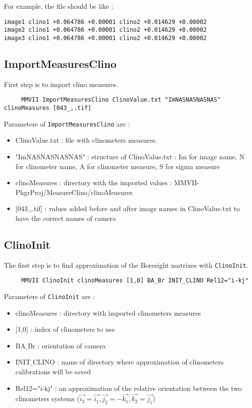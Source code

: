 For example, the file should be like :

\begin{lstlisting}
image1 clino1 +0.064786 +0.00001 clino2 +0.014629 +0.00002
image2 clino1 +0.064786 +0.00001 clino2 +0.014629 +0.00002
image3 clino1 +0.064786 +0.00001 clino2 +0.014629 +0.00002
\end{lstlisting}


\subsection{ImportMeasuresClino}

First step is to import clino measures.

\begin{lstlisting}
     MMVII ImportMeasuresClino ClinoValue.txt "ImNASNASNASNAS" clinoMeasures [043_,.tif]
\end{lstlisting}

Parameters of {\tt ImportMeasuresClino} are :
\begin{itemize}
     \item ClinoValue.txt : file with clinometers measures.
     \item "ImNASNASNASNAS" : structure of ClinoValue.txt : Im for image name, N for clinometer name, A for clinometer measure, S for sigma measure
     \item clinoMeasures : directory with the imported values : MMVII-PhgrProj/MeasureClino/clinoMeasures
     \item $[$043$\_$,.tif$]$ : values added before and after image names in ClinoValue.txt to have the correct names of camera
\end{itemize}


\subsection{ClinoInit}

The first step is to find approximation of the Boresight matrixes with {\tt ClinoInit}.

\begin{lstlisting}
     MMVII ClinoInit clinoMeasures [1,0] BA_Br INIT_CLINO Rel12="i-kj"
\end{lstlisting}


Parameters of {\tt ClinoInit} are :
\begin{itemize}
     \item clinoMeasures : directory with imported clinometers measures
     \item $[$1,0$]$ : index of clinometers to use
     \item BA$\_$Br : orientation of camera
     \item INIT$\_$CLINO : name of directory where approximation of clinometers calibrations will be saved
     \item Rel12="i-kj" : an approximation of the relative orientation between the two clinometers systems ($\Vec{i_2}=\Vec{i_1}, \Vec{j_2}=-\Vec{k_1}, \Vec{k_2}=\Vec{j_1}$)
\end{itemize}

